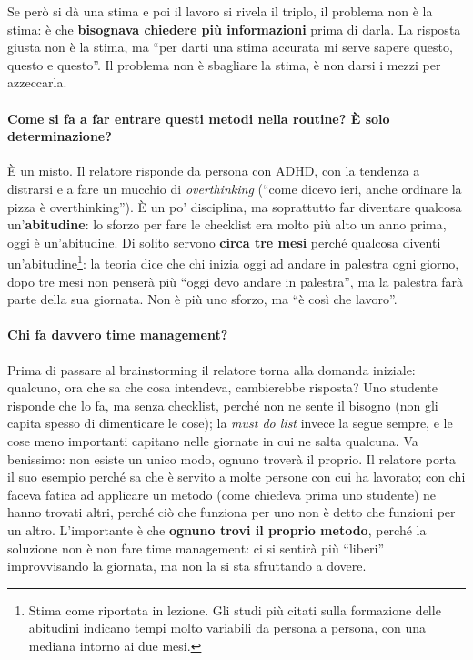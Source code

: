 Se però si dà una stima e poi il lavoro si rivela il triplo, il problema non è la
stima: è che \textbf{bisognava chiedere più informazioni} prima di darla. La
risposta giusta non è la stima, ma ``per darti una stima accurata mi serve sapere
questo, questo e questo''. Il problema non è sbagliare la stima, è non darsi i mezzi
per azzeccarla.

\paragraph{Come si fa a far entrare questi metodi nella routine? È solo
determinazione?} È un misto. Il relatore risponde da persona con ADHD, con la
tendenza a distrarsi e a fare un mucchio di \emph{overthinking} (``come dicevo ieri,
anche ordinare la pizza è overthinking''). È un po' disciplina, ma soprattutto far
diventare qualcosa un'\textbf{abitudine}: lo sforzo per fare le checklist era molto
più alto un anno prima, oggi è un'abitudine. Di solito servono \textbf{circa tre
mesi} perché qualcosa diventi un'abitudine\footnote{Stima come riportata in lezione.
Gli studi più citati sulla formazione delle abitudini indicano tempi molto variabili
da persona a persona, con una mediana intorno ai due mesi.}: la teoria dice che chi
inizia oggi ad andare in palestra ogni giorno, dopo tre mesi non penserà più ``oggi
devo andare in palestra'', ma la palestra farà parte della sua giornata. Non è più
uno sforzo, ma ``è così che lavoro''.

\paragraph{Chi fa davvero time management?} Prima di passare al brainstorming il
relatore torna alla domanda iniziale: qualcuno, ora che sa che cosa intendeva,
cambierebbe risposta? Uno studente risponde che lo fa, ma senza checklist, perché
non ne sente il bisogno (non gli capita spesso di dimenticare le cose); la
\emph{must do list} invece la segue sempre, e le cose meno importanti capitano nelle
giornate in cui ne salta qualcuna. Va benissimo: non esiste un unico modo, ognuno
troverà il proprio. Il relatore porta il suo esempio perché sa che è servito a molte
persone con cui ha lavorato; con chi faceva fatica ad applicare un metodo (come
chiedeva prima uno studente) ne hanno trovati altri, perché ciò che funziona per uno
non è detto che funzioni per un altro. L'importante è che \textbf{ognuno trovi il
proprio metodo}, perché la soluzione non è non fare time management: ci si sentirà
più ``liberi'' improvvisando la giornata, ma non la si sta sfruttando a dovere.

